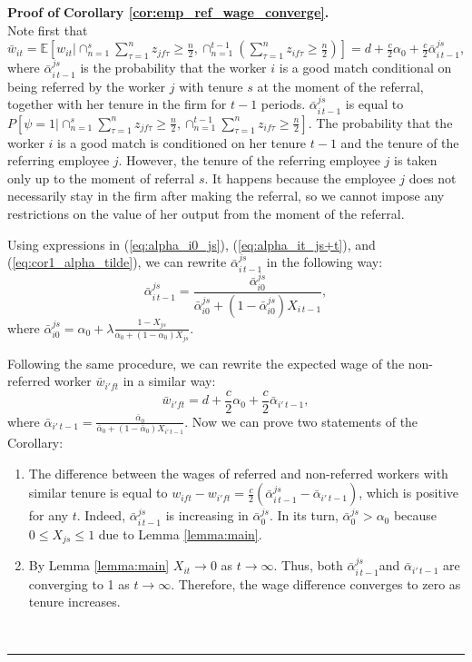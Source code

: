 \documentclass[12pt]{article}
\newenvironment{proof}[1][Proof of]{\noindent\textbf{#1} }{\ \rule{0.5em}{0.5em}}
\begin{document}
\begin{proof}
\textbf{Corollary \ref{cor:emp_ref_wage_converge}.}\\
Note first that $\bar{w}_{it} = \mathbb{E}[w_{it}\vert \cap_{n=1}^{s}\sum_{\tau = 1}^{n}z_{jf\tau}\geq \frac{n}{2}, \cap_{n=1}^{t-1} (\sum_{\tau = 1}^{n} z_{if\tau}\geq \frac{n}{2})] = d+\frac{c}{2}\alpha_0+\frac{c}{2}\bar{\alpha}_{i\,t-1}^{js}$, where $\bar{\alpha}_{i\,t-1}^{js}$ is the probability that the worker $i$ is a good match conditional on being referred by the worker $j$ with tenure $s$ at the moment of the referral, together with her tenure in the firm for $t-1$ periods. $\bar{\alpha}_{i\,t-1}^{js}$ is equal to $P[\psi=1 \vert \cap_{n=1}^{s}\sum_{\tau = 1}^{n}z_{jf\tau}\geq \frac{n}{2}, \cap_{n=1}^{t-1}\sum_{\tau = 1}^{n}z_{if\tau}\geq \frac{n}{2}]$. The probability that the worker $i$ is a good match is conditioned on her tenure $t-1$ and the tenure of the referring employee $j$. However, the tenure of the referring employee $j$ is taken only up to the moment of referral $s$. It happens because the employee $j$ does not necessarily stay in the firm after making the referral, so we cannot impose any restrictions on the value of her output from the moment of the referral.

Using expressions in (\ref{eq:alpha_i0_js}), (\ref{eq:alpha_it_js+t}), and (\ref{eq:cor1_alpha_tilde}), we can rewrite $\bar{\alpha}_{i\,t-1}^{js}$ in the following way:
\begin{equation}\label{eq:cor_3_1}
\bar{\alpha}_{i\,t-1}^{js}= \frac{\bar{\alpha}_{i0}^{js}}{\bar{\alpha}_{i0}^{js} + (1-\bar{\alpha}_{i0}^{js})X_{i\, t-1}},
\end{equation}
where $\bar{\alpha}_{i0}^{js} = \alpha_0 + \lambda \frac{1-X_{js}}{\alpha_0+(1-\alpha_0)X_{js}}$.

Following the same procedure, we can rewrite the expected wage of the non-referred worker $\bar{w}_{i'ft}$ in a similar way:
\begin{equation}
\bar{w}_{i'ft} = d+\frac{c}{2}\alpha_0+\frac{c}{2}\bar{\alpha}_{i'\,t-1},
\end{equation}
where $\bar{\alpha}_{i'\,t-1} = \frac{\bar{\alpha}_{0}}{\bar{\alpha}_{0} + (1-\bar{\alpha}_{0})X_{i'\, t-1}}$. 
Now we can prove two statements of the Corollary:
\begin{enumerate}[label={\roman*})]
\item The difference between the wages of referred and non-referred workers with similar tenure is equal to $w_{ift}-w_{i'ft} = \frac{c}{2}(\bar{\alpha}_{i\,t-1}^{js}-\bar{\alpha}_{i'\,t-1})$, which is positive for any $t$. Indeed, $\bar{\alpha}_{i\,t-1}^{js}$ is increasing in $\bar{\alpha}_{0}^{js}$. In its turn, $\bar{\alpha}_{0}^{js}>\alpha_0$ because $0 \leq X_{js}\leq 1$ due to Lemma \ref{lemma:main}.
\item By Lemma \ref{lemma:main} $X_{it} \rightarrow 0$ as $t \rightarrow \infty$. Thus, both $\bar{\alpha}_{i\,t-1}^{js}$and $\bar{\alpha}_{i'\,t-1}$ are converging to 1 as $t \rightarrow \infty$. Therefore, the wage difference converges to zero as tenure increases.
\end{enumerate}
\end{proof}
\end{document}
